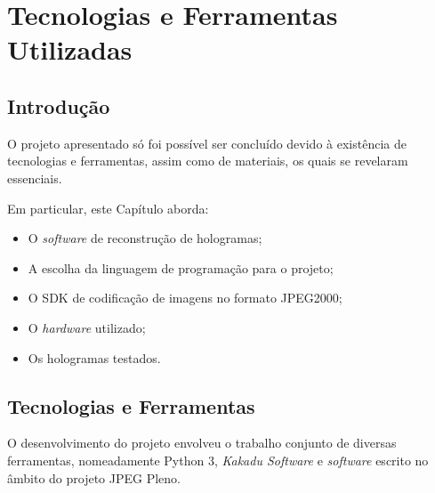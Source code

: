 \chapter{Tecnologias e Ferramentas Utilizadas}
\label{chap:tecno-ferra}

\section{Introdução}
\label{chap3:sec:intro}

O projeto apresentado só foi possível ser concluído devido à existência de tecnologias e ferramentas, assim como de materiais, os quais se revelaram essenciais.

Em particular, este Capítulo aborda:

\begin{itemize}
    \item O \textit{software} de reconstrução de hologramas;
    \item A escolha da linguagem de programação para o projeto;
    \item O \ac{SDK} de codificação de imagens no formato JPEG2000;
    \item O \textit{hardware} utilizado;
    \item Os hologramas testados.
\end{itemize}



\section{Tecnologias e Ferramentas}
\label{chap3:sec:tec-ferr}

O desenvolvimento do projeto envolveu o trabalho conjunto de diversas ferramentas, nomeadamente Python 3, \textit{Kakadu Software} e \textit{software} escrito no âmbito do projeto JPEG Pleno.


